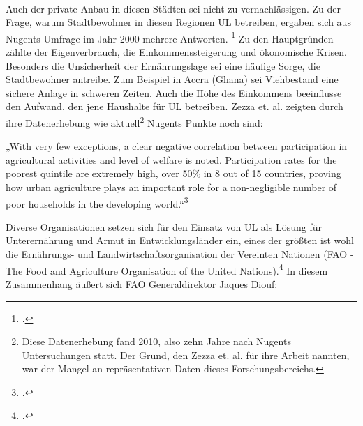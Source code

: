 \documentclass{scrartcl}
\begin{document}
\\
Auch der private Anbau in diesen Städten sei nicht zu vernachlässigen. Zu der Frage, warum Stadtbewohner in diesen Regionen UL betreiben, ergaben sich aus Nugents Umfrage im Jahr 2000 mehrere Antworten. \footcite[Vgl.][S.74]{Nugent2000TheEconomies} Zu den Hauptgründen zählte der Eigenverbrauch, die Einkommenssteigerung und ökonomische Krisen. Besonders die Unsicherheit der Ernährungslage sei eine häufige Sorge, die Stadtbewohner antreibe. Zum Beispiel in Accra (Ghana) sei Viehbestand eine sichere Anlage in schweren Zeiten. Auch die Höhe des Einkommens beeinflusse den Aufwand, den jene Haushalte für UL betreiben. Zezza et. al. zeigten durch ihre Datenerhebung wie aktuell\footnote{Diese Datenerhebung fand 2010, also zehn Jahre nach Nugents Untersuchungen statt. Der Grund, den Zezza et. al. für ihre Arbeit nannten, war der Mangel an repräsentativen Daten dieses Forschungsbereichs.} Nugents Punkte noch sind:
\begin{displayquote}
„With very few exceptions, a clear negative correlation between participation in agricultural activities and level of welfare is noted. Participation rates for the poorest quintile are extremely high, over 50\% in 8 out of 15 countries, proving how urban agriculture plays an important role for a non-negligible number of poor households in the developing world.“\footcite[S.268]{Zezza2010UrbanCountries}
\end{displayquote}

Diverse Organisationen setzen sich für den Einsatz von UL als Lösung für Unterernährung und Armut in Entwicklungsländer ein, eines der größten ist wohl die Ernährungs- und Landwirtschaftsorganisation der Vereinten Nationen (FAO - The Food and Agriculture Organisation of the United Nations).\footcite[Vgl.][S.6ff]{FAOAboutNations} In diesem Zusammenhang äußert sich FAO Generaldirektor Jaques Diouf:
\end{document}
